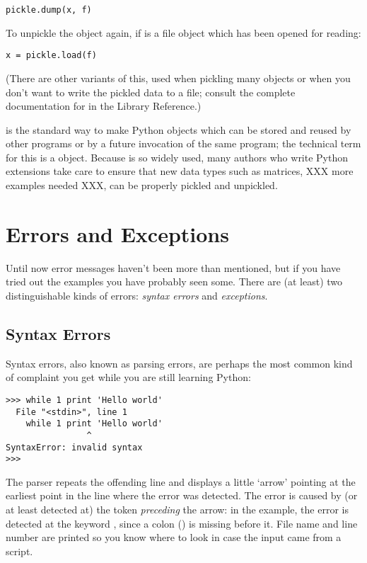 \bcode\begin{verbatim}
pickle.dump(x, f)
\end{verbatim}\ecode
%
To unpickle the object again, if  is a file object which has been
opened for reading:

\bcode\begin{verbatim}
x = pickle.load(f)
\end{verbatim}\ecode
%
(There are other variants of this, used when pickling many objects or
when you don't want to write the pickled data to a file; consult the
complete documentation for  in the Library Reference.)

 is the standard way to make Python objects which can be
stored and reused by other programs or by a future invocation of the
same program; the technical term for this is a 
object.  Because  is so widely used, many authors who
write Python extensions take care to ensure that new data types such
as matrices, XXX more examples needed XXX, can be properly pickled and
unpickled.



\chapter{Errors and Exceptions}

Until now error messages haven't been more than mentioned, but if you
have tried out the examples you have probably seen some.  There are
(at least) two distinguishable kinds of errors: \emph{syntax errors}
and \emph{exceptions}.

\section{Syntax Errors}

Syntax errors, also known as parsing errors, are perhaps the most common
kind of complaint you get while you are still learning Python:

\bcode\begin{verbatim}
>>> while 1 print 'Hello world'
  File "<stdin>", line 1
    while 1 print 'Hello world'
                ^
SyntaxError: invalid syntax
>>> 
\end{verbatim}\ecode
%
The parser repeats the offending line and displays a little `arrow'
pointing at the earliest point in the line where the error was detected.
The error is caused by (or at least detected at) the token
\emph{preceding}
the arrow: in the example, the error is detected at the keyword
, since a colon (\code{:}) is missing before it.
File name and line number are printed so you know where to look in case
the input came from a script.

